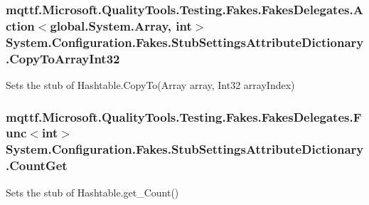 \hypertarget{class_system_1_1_configuration_1_1_fakes_1_1_stub_settings_attribute_dictionary_a9f3c69ed4bdb9a39cad6770873e57741}{
\subsubsection[{Copy\-To\-Array\-Int32}]{\setlength{\rightskip}{0pt plus 5cm}mqttf.\-Microsoft.\-Quality\-Tools.\-Testing.\-Fakes.\-Fakes\-Delegates.\-Action$<$global.\-System.\-Array, int$>$ System.\-Configuration.\-Fakes.\-Stub\-Settings\-Attribute\-Dictionary.\-Copy\-To\-Array\-Int32}}\label{class_system_1_1_configuration_1_1_fakes_1_1_stub_settings_attribute_dictionary_a9f3c69ed4bdb9a39cad6770873e57741}


Sets the stub of Hashtable.\-Copy\-To(\-Array array, Int32 array\-Index)

\hypertarget{class_system_1_1_configuration_1_1_fakes_1_1_stub_settings_attribute_dictionary_ac1f7a6e89a5cbbcd55218c1984785455}{
\subsubsection[{Count\-Get}]{\setlength{\rightskip}{0pt plus 5cm}mqttf.\-Microsoft.\-Quality\-Tools.\-Testing.\-Fakes.\-Fakes\-Delegates.\-Func$<$int$>$ System.\-Configuration.\-Fakes.\-Stub\-Settings\-Attribute\-Dictionary.\-Count\-Get}}\label{class_system_1_1_configuration_1_1_fakes_1_1_stub_settings_attribute_dictionary_ac1f7a6e89a5cbbcd55218c1984785455}


Sets the stub of Hashtable.\-get\-\_\-\-Count()

